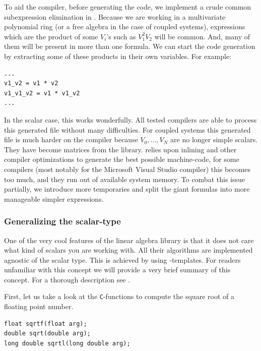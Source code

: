 To aid the compiler, before generating the code, we implement a crude common subexpression elimination in \sage{}. Because we are working in a multivariate polynomial ring (or a free algebra in the case of coupled systems), expressions which are the product of some $V_i$'s such as  $V_1^2 V_2$ will be common. And, many of them will be present in more than one formula. We can start the code generation by extracting some of these products in their own variables. For example:
\begin{verbatim}
...
v1_v2 = v1 * v2
v1_v1_v2 = v1 * v1_v2
...
\end{verbatim}

In the scalar case, this works wonderfully. All tested compilers are able to process this generated file without many difficulties. For coupled systems this generated file is much harder on the compiler because $V_0, \dots, V_N$ are no longer simple scalars. They have become matrices from the \Eigen{} library. \Eigen{} relies upon inlining and other compiler optimizations to generate the best possible machine-code, for some compilers (most notably for the Microsoft Visual Studio compiler) this becomes too much, and they run out of available system memory. To combat this issue partially, we introduce more temporaries and split the giant formulas into more manageable simpler expressions.

\subsubsection{Generalizing the scalar-type}\label{sec:c2_generalizing_scalar}

One of the very cool features of the linear algebra library \Eigen is that it does not care what kind of scalars you are working with. All their algorithms are implemented agnostic of the scalar type. This is achieved by using \cpp{}-templates. For readers unfamiliar with this concept we will provide a very brief summary of this concept. For a thorough description see \cite[Chapter~23]{stroustrup_programming_2013}.

First, let us take a look at the \texttt{C}-functions to compute the square root of a floating point number.
\begin{verbatim}
float sqrtf(float arg);
double sqrt(double arg);
long double sqrtl(long double arg);
\end{verbatim}

